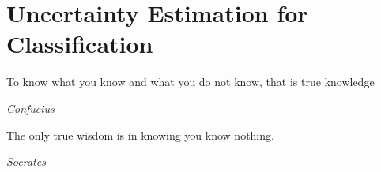 \chapter{Uncertainty Estimation for Classification}
\label{chap:classification}

\epigraph{To know what you know and what you do not know, that is true knowledge}{\textit{Confucius}}

\epigraph{The only true wisdom is in knowing you know nothing.}{\textit{Socrates}}







